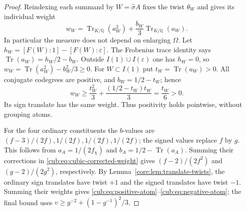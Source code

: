 \documentclass[11pt,a4paper]{article}
\theoremstyle{definition}\newtheorem{definition}[theorem]{Definition}
\theoremstyle{remark}\newtheorem{remark}[theorem]{Remark}
\newcommand{\Q}{\mathbb Q}
\numberwithin{equation}{section}
\begin{document}
\begin{proof}
Reindexing each summand by $W=\widehat\sigma A$ fixes the twist
$\theta_W$ and gives its individual weight
\begin{equation}\label{cub:eq:cubic-corrected-weight}
 w_W=\operatorname{Tr}_{K/\Q}(a_W^2)
              +\frac{b_W}{3}\operatorname{Tr}_{K/\Q}(a_W).
\end{equation}
In particular the measure does not depend on enlarging $\Omega$.
Let $h_W=[F(W):1]-[F(W):\varepsilon]$. The Frobenius trace identity
says $\operatorname{Tr}(a_W)=h_W/2-b_W$.
Outside $I(1)\cup I(\varepsilon)$ one has $h_W=0$, so
$w_W=\operatorname{Tr}(a_W^2)-b_W^2/3\ge0$.
For $W\subset I(1)$ put $t_W=\operatorname{Tr}(a_W)>0$.
All conjugate codegrees are positive, and $b_W=1/2-t_W$; hence
\[
 w_W\ge\frac{t_W^2}{3}+\frac{(1/2-t_W)t_W}{3}
       =\frac{t_W}{6}>0.
\]
Its sign translate has the same weight. Thus positivity holds
pointwise, without grouping atoms.

For the four ordinary constituents the $b$-values are
$(f-3)/(2f),1/(2f),1/(2f),1/(2f)$; the signed values replace $f$
by $g$. This follows from $a_A=1/(2f_\chi)$ and
$b_A=1/2-\operatorname{Tr}(a_A)$. Summing their corrections in
\eqref{cub:eq:cubic-corrected-weight} gives $(f-2)/(2f^2)$ and
$(g-2)/(2g^2)$, respectively. By
Lemma~\ref{core:lem:translate-twists}, the
ordinary sign translates have twist $+1$ and the signed translates
have twist $-1$. Summing their weights gives
\eqref{cub:eq:positive-atom}--\eqref{cub:eq:negative-atom}; the final
bound uses $v\ge g^{-2}+(1-g^{-1})^2/3$.
\end{proof}
\end{document}
